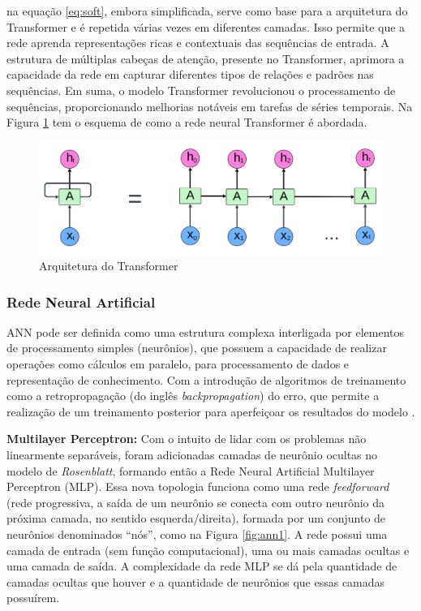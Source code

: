  \noindent na equação \eqref{eq:soft}, embora simplificada, serve como base para a arquitetura do Transformer e é repetida várias vezes em diferentes camadas. Isso permite que a rede aprenda representações ricas e contextuais das sequências de entrada. A estrutura de múltiplas cabeças de atenção, presente no Transformer, aprimora a capacidade da rede em capturar diferentes tipos de relações e padrões nas sequências. Em suma, o modelo Transformer revolucionou o processamento de sequências, proporcionando melhorias notáveis em tarefas de séries temporais. Na Figura \ref{fig:transformer} tem o esquema de como a rede neural Transformer é abordada.
 
 \begin{figure}[!htb]
 	\centering
 	\caption{Arquitetura do Transformer}
 	\label{fig:transformer}
 	\includegraphics[width=0.7\linewidth]{Modelos/Figuras/Transformer}
 	
 \end{figure}
 
 \subsubsection{Rede Neural Artificial}
 
 ANN pode ser definida como uma estrutura complexa interligada por elementos de processamento simples (neurônios), que possuem a capacidade de realizar operações como cálculos em paralelo, para processamento de dados e representação de conhecimento. Com a introdução de algoritmos de treinamento como a retropropagação (do inglês \textit{backpropagation}) do erro, que permite a realização de um treinamento posterior para aperfeiçoar os resultados do modelo \cite{Grubler2018}.
 
 \noindent\textbf{Multilayer Perceptron:}
 Com o intuito de lidar com os problemas não linearmente separáveis, foram adicionadas camadas de neurônio ocultas no modelo de \textit{Rosenblatt}, formando então a Rede Neural Artificial Multilayer Perceptron (MLP).
 Essa nova topologia funciona como uma rede \textit{feedforward} (rede progressiva, a saída de um neurônio se conecta com outro neurônio da próxima camada, no sentido esquerda/direita), formada por um conjunto de neurônios denominados ``nós'', como  na Figura \ref{fig:ann1}. A rede possui uma camada de entrada (sem função computacional), uma ou mais camadas ocultas e uma camada de saída. A complexidade da rede MLP se dá pela quantidade de camadas ocultas que houver e a quantidade de neurônios que essas camadas possuírem.
 
